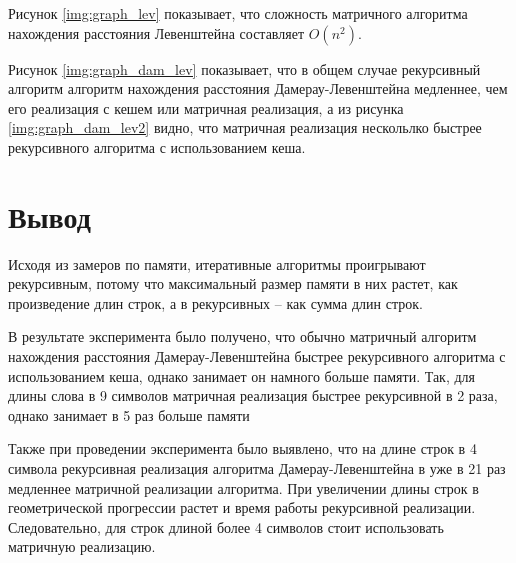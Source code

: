 Рисунок \ref{img:graph_lev} показывает, что сложность матричного алгоритма нахождения расстояния Левенштейна составляет $O(n^2)$.

Рисунок \ref{img:graph_dam_lev} показывает, что в общем случае рекурсивный алгоритм алгоритм нахождения расстояния Дамерау-Левенштейна медленнее, чем его реализация с кешем или матричная реализация, а из рисунка \ref{img:graph_dam_lev2}  видно, что матричная реализация нескольлко быстрее рекурсивного алгоритма с использованием кеша.


\section{Вывод}

Исходя из замеров по памяти, итеративные алгоритмы проигрывают рекурсивным, потому что максимальный размер памяти в них растет, как произведение длин строк, а в рекурсивных -- как сумма длин строк.

В результате эксперимента было получено, что обычно матричный алгоритм нахождения расстояния Дамерау-Левенштейна быстрее рекурсивного алгоритма с использованием кеша, однако занимает он намного больше памяти. Так, для длины слова в 9 символов матричная реализация быстрее рекурсивной в 2 раза, однако занимает в 5 раз больше памяти

Также при проведении эксперимента было выявлено, что на длине строк в 4 символа рекурсивная реализация алгоритма Дамерау-Левенштейна в уже в 21 раз медленнее матричной реализации алгоритма. При увеличении длины строк в геометрической прогрессии растет и время работы рекурсивной реализации. Следовательно, для строк длиной более 4 символов стоит использовать матричную реализацию.
